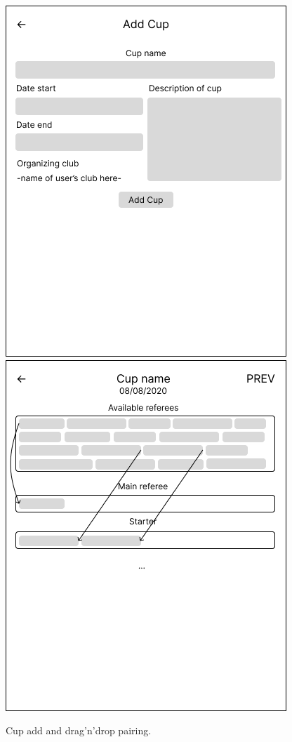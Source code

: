 \begin{figure}[h]	
	\centering
    \includegraphics[scale=0.457]{img/A-new-cup.png}
\includegraphics[scale=0.457]{img/A-pairing.png}
\caption{Cup add and drag'n'drop pairing.}
\label{fig1.5:feprivatepages2}
\end{figure}
\newpage
